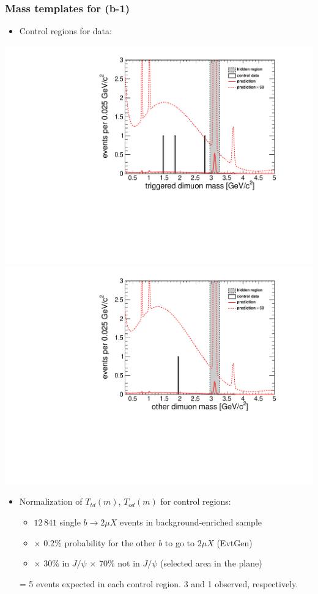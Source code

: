 \documentclass[compress]{beamer}
\begin{document}
\begin{frame}
\frametitle{Mass templates for (b-1)}

\begin{itemize}
\item Control regions for data:
\end{itemize}

\includegraphics[width=0.5\linewidth]{control_massC.pdf}
\includegraphics[width=0.5\linewidth]{control_massF.pdf}

\begin{itemize}
\item Normalization of $T_{td}(m)$, $T_{od}(m)$ for control regions:
\begin{itemize}
  \item $12\,841$ single $b \to 2\mu X$ events in background-enriched sample
  \item $\times$ 0.2\% probability for the other $b$ to go to $2\mu X$ (EvtGen)
  \item $\times$ 30\% in $J/\psi$ $\times$ 70\% not in $J/\psi$ (selected area in the plane)
\end{itemize}
= 5 events expected in each control region.  3 and 1 observed,
respectively.
\end{itemize}
\end{frame}

\end{document}
